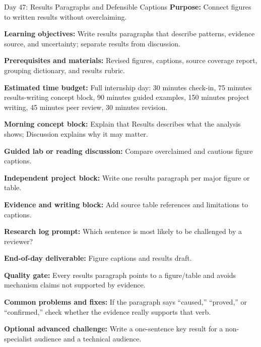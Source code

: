 \begin{dailybox}{Day 47: Results Paragraphs and Defensible Captions}
\textbf{Purpose:} Connect figures to written results without overclaiming.

\textbf{Learning objectives:} Write results paragraphs that describe patterns, evidence source, and uncertainty; separate results from discussion.

\textbf{Prerequisites and materials:} Revised figures, captions, source coverage report, grouping dictionary, and results rubric.

\textbf{Estimated time budget:} Full internship day: 30 minutes check-in, 75 minutes results-writing concept block, 90 minutes guided examples, 150 minutes project writing, 45 minutes peer review, 30 minutes revision.

\textbf{Morning concept block:} Explain that Results describes what the analysis shows; Discussion explains why it may matter.

\textbf{Guided lab or reading discussion:} Compare overclaimed and cautious figure captions.

\textbf{Independent project block:} Write one results paragraph per major figure or table.

\textbf{Evidence and writing block:} Add source table references and limitations to captions.

\textbf{Research log prompt:} Which sentence is most likely to be challenged by a reviewer?

\textbf{End-of-day deliverable:} Figure captions and results draft.

\textbf{Quality gate:} Every results paragraph points to a figure/table and avoids mechanism claims not supported by evidence.

\textbf{Common problems and fixes:} If the paragraph says ``caused,'' ``proved,'' or ``confirmed,'' check whether the evidence really supports that verb.

\textbf{Optional advanced challenge:} Write a one-sentence key result for a non-specialist audience and a technical audience.
\end{dailybox}

